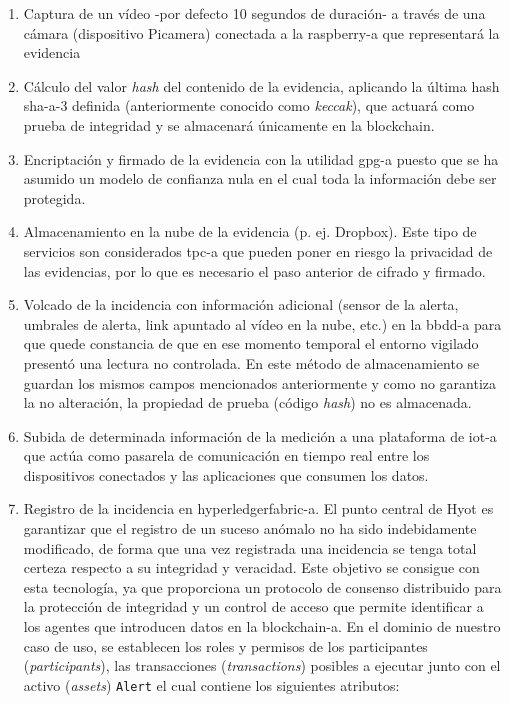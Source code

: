 \documentclass[12pt,a4paper, twoside]{report}
\begin{document}
	\begin{enumerate}
		\item Captura de un vídeo -por defecto 10 segundos de duración- a través de una cámara (dispositivo Picamera) conectada a la \gls{raspberry-a} que representará la evidencia
		\item Cálculo del valor \textit{hash} del contenido de la evidencia, aplicando la última \gls{hash} \gls{sha-a}-3 definida (anteriormente conocido como \textit{keccak}), que actuará como prueba de integridad y se almacenará únicamente en la \Gls{blockchain}. 
		\item Encriptación y firmado de la evidencia con la utilidad \gls{gpg-a} puesto que se ha asumido un modelo de confianza nula en el cual toda la información debe ser protegida.
		\item Almacenamiento en la nube de la evidencia (p. ej. Dropbox). Este tipo de servicios son considerados \gls{tpc-a} que pueden poner en riesgo la privacidad de las evidencias, por lo que es necesario el paso anterior de cifrado y firmado.
		\item Volcado de la incidencia con información adicional (sensor de la alerta, umbrales de alerta, link apuntado al vídeo en la nube, etc.) en la \gls{bbdd-a} para que quede constancia de que en ese momento temporal el entorno vigilado presentó una lectura no controlada. En este método de almacenamiento se guardan los mismos campos mencionados anteriormente y como no garantiza la no alteración, la propiedad de prueba (código \textit{hash}) no es almacenada.
		\item Subida de determinada información de la medición a una plataforma de \gls{iot-a} que actúa como pasarela de comunicación en tiempo real entre los dispositivos conectados y las aplicaciones que consumen los datos.
		\item Registro de la incidencia	en \gls{hyperledgerfabric-a}. El punto central de Hyot es garantizar que el registro de un suceso anómalo no ha sido indebidamente modificado, de forma que una vez registrada una incidencia se tenga total certeza respecto a su integridad y veracidad. Este objetivo se consigue con esta tecnología, ya que proporciona un protocolo de consenso distribuido para la protección de integridad y un control de acceso que permite identificar a los agentes que introducen datos en la \Gls{blockchain-a}. En el dominio de nuestro caso de uso, se establecen los roles y permisos de los participantes (\textit{\glspl{participant}}), las transacciones (\textit{\glspl{transaction}}) posibles a ejecutar junto con el activo (\textit{\glspl{asset}}) \texttt{Alert} el cual contiene los siguientes atributos: 
		

\end{enumerate}
\end{document}
